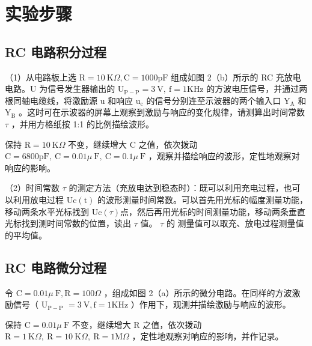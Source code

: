 \documentclass{article}
\begin{document}
\section{实验步骤}

\subsection{RC 电路积分过程}
（1）从电路板上选 $\mathrm{R}=10 \mathrm{~K} \Omega, \mathrm{C}=1000 \mathrm{pF}$ 组成如图 2（b）所示的 RC 充放电电路。U 为信号发生器输出的 $\mathrm{U}_{\mathrm{P}-\mathrm{P}}=3 \mathrm{~V}, ~ \mathrm{f}=1 \mathrm{KHz}$ 的方波电压信号，并通过两根同轴电缆线，将激励源 u 和响应 $\mathrm{u}_{\mathrm{c}}$ 的信号分别连至示波器的两个输入口 $\mathrm{Y}_{\mathrm{A}}$ 和 $\mathrm{Y}_{\mathrm{B}}$ 。这时可在示波器的屏幕上观察到激励与响应的变化规律，请测算出时间常数 $\tau$ ，并用方格纸按 1:1 的比例描绘波形。

保持 $\mathrm{R}=10 \mathrm{~K} \Omega$ 不变，继续增大 C 之值，依次拨动 $\mathrm{C}=6800 \mathrm{pF}, ~ \mathrm{C}=0.01 \mu \mathrm{~F}, ~ \mathrm{C}=0.1 \mu \mathrm{~F}$ ，观察并描绘响应的波形，定性地观察对响应的影响。

（2）时间常数 $\tau$ 的测定方法（充放电达到稳态时）：既可以利用充电过程，也可以利用放电过程 $\mathrm{Uc}(\mathrm{t})$ 的波形测量时间常数。可以首先用光标的幅度测量功能，移动两条水平光标找到 $\mathrm{Uc}(\tau)$点，然后再用光标的时间测量功能，移动两条垂直光标找到测时间常数的位置，读出 $\tau$ 值。 $\tau$ 的
测量值可以取充、放电过程测量值的平均值。 
\subsection{RC 电路微分过程}

令 $\mathrm{C}=0.01 \mu \mathrm{~F}, \mathrm{R}=100 \Omega$ ，组成如图 2（a）所示的微分电路。在同样的方波激励信号（ $\mathrm{U}_{\mathrm{P}-\mathrm{P}}$ $=3 \mathrm{~V}, \mathrm{f}=1 \mathrm{KHz}$ ）作用下，观测并描绘激励与响应的波形。

保持 $\mathrm{C}=0.01 \mu \mathrm{~F}$ 不变，继续增大 R 之值，依次拨动 $\mathrm{R}=1 \mathrm{~K} \Omega, ~ \mathrm{R}=10 \mathrm{~K} \Omega, ~ \mathrm{R}=1 \mathrm{M} \Omega$ ，定性地观察对响应的影响，并作记录。
\end{document}

